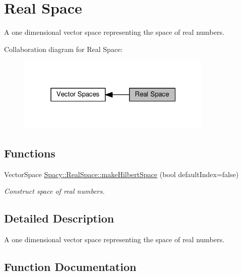 \hypertarget{group__RealGroup}{}\section{Real Space}
\label{group__RealGroup}


A one dimensional vector space representing the space of real numbers.  


Collaboration diagram for Real Space\+:
\nopagebreak
\begin{figure}[H]
\begin{center}
\leavevmode
\includegraphics[width=265pt]{group__RealGroup}
\end{center}
\end{figure}
\subsection*{Functions}
\begin{DoxyCompactItemize}
\item 
Vector\+Space \hyperlink{group__RealGroup_gaa07f743f9874ecff062c511b7126f8b6}{Spacy\+::\+Real\+Space\+::make\+Hilbert\+Space} (bool default\+Index=false)
\begin{DoxyCompactList}\small\item\em Construct space of real numbers. \end{DoxyCompactList}\end{DoxyCompactItemize}


\subsection{Detailed Description}
A one dimensional vector space representing the space of real numbers. 



\subsection{Function Documentation}
